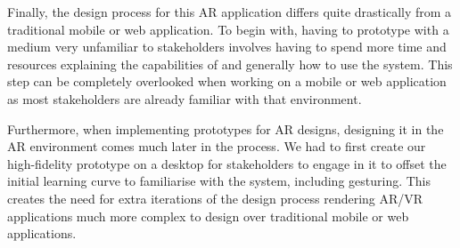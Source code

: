 \documentclass[12pt,a4paper]{article}
\begin{document}
Finally, the design process for this AR application differs quite drastically from a traditional mobile or web application. To begin with, having to prototype with a medium very unfamiliar to stakeholders involves having to spend more time and resources explaining the capabilities of and generally how to use the system. This step can be completely overlooked when working on a mobile or web application as most stakeholders are already familiar with that environment. 
	
Furthermore, when implementing prototypes for AR designs, designing it in the AR environment comes much later in the process. We had to first create our high-fidelity prototype on a desktop for stakeholders to engage in it to offset the initial learning curve to familiarise with the system, including gesturing. This creates the need for extra iterations of the design process rendering AR/VR applications much more complex to design over traditional mobile or web applications.  




\end{document}
